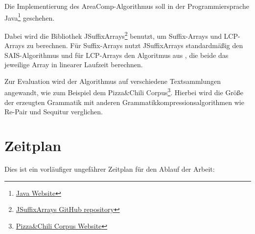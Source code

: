 Die Implementierung des AreaComp-Algorithmus soll in der Programmiersprache Java\footnote{\href{https://www.java.com}{Java Website}} geschehen. 

Dabei wird die Bibliothek JSuffixArrays\footnote{\href{https://github.com/carrotsearch/jsuffixarrays}{JSuffixArrays GitHub repository}} benutzt, um Suffix-Arrays und LCP-Arrays zu berechnen. Für Suffix-Arrays nutzt JSuffixArrays standardmäßig den SAIS-Algorithmus \cite{nong_two_2011} und für LCP-Arrays den Algoritmus aus \cite{kasai_linear-time_2001}, die beide das jeweilige Array in linearer Laufzeit berechnen.

Zur Evaluation wird der Algorithmus auf verschiedene Textsammlungen angewandt, wie zum Beispiel dem Pizza\&Chili Corpus\footnote{\href{http://pizzachili.dcc.uchile.cl}{Pizza\&Chili Corpus Website}}. 
Hierbei wird die Größe der erzeugten Grammatik mit anderen Grammatikkompressionsalgorithmen wie Re-Pair \cite{larsson_offline_1999} und Sequitur \cite{nevill-manning_identifying_1997} verglichen.

\section{Zeitplan}




Dies ist ein vorläufiger ungefährer Zeitplan für den Ablauf der Arbeit:

